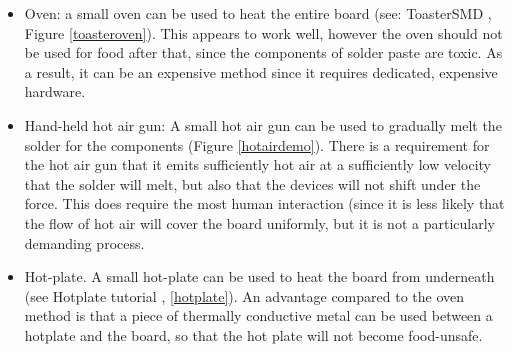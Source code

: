 \begin{itemize} %
	\item	Oven: a small oven can be used to heat the entire board (see: ToasterSMD \cite{toastersmd}, Figure \ref{toasteroven}). This appears to
			work well, however the oven should not be used for food after that, since the components of solder paste are toxic. As a result,
			it can be an expensive method since it requires dedicated, expensive hardware.
	\item	Hand-held hot air gun: A small hot air gun can be used to gradually melt the solder for the components (Figure \ref{hotairdemo}). There is a requirement
			for the hot air gun that it emits sufficiently hot air at a sufficiently low velocity that the solder will melt, but also that
			the devices will not shift under the force. 
			This does require the most human interaction (since it is less likely that the flow of hot air will cover the board uniformly, but it
			is not a particularly demanding process.
	\item	Hot-plate. A small hot-plate can be used to heat the board from underneath (see Hotplate tutorial \cite{hotplate}, \ref{hotplate}).
			An advantage compared to the oven method is that a piece of thermally conductive metal can be used between a hotplate and the board, so
			that the hot plate will not become food-unsafe. 
\end{itemize}
		
